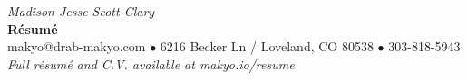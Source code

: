 
\begin{center}
  {\huge \textit{\color{titlegreydark} Madison Jesse Scott-Clary}}\\
  {\Huge{\textbf{R\'esum\'e}}}\\
  {\color{titlegreydark} makyo@drab-makyo.com $\bullet$ 6216 Becker Ln / Loveland, CO 80538 $\bullet$ 303-818-5943}\\
  {\small \color{titlegreylight} \textit{Full r\'esum\'e and C.V. available at makyo.io/resume}}
\end{center}
